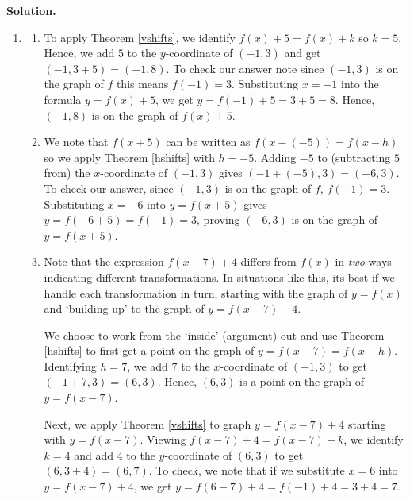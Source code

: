 \begin{ex}
\begin{enumerate}
 \end{enumerate}
 
 \newpage
 
 {\bf Solution.}
 
 \begin{enumerate}
 
 \item 
  
 \begin{enumerate}  
 
 \item To apply Theorem \ref{vshifts}, we identify $f(x)+5 = f(x)+k$  so $k = 5$.  Hence, we add $5$ to the $y$-coordinate of $(-1,3)$  and get  $(-1,3+5) = (-1,8)$.  To check our answer note since $(-1,3)$ is on the graph of $f$ this means $f(-1) = 3$.  Substituting  $x=-1$ into the formula $y = f(x)+5$, we get $y = f(-1)+5 = 3+5 = 8$.  Hence, $(-1,8)$ is on the graph of $f(x)+5$.
 
 \item We note that $f(x+5)$ can be written as $f(x-(-5)) = f(x-h)$ so we apply Theorem \ref{hshifts} with $h=-5$.  Adding $-5$ to (subtracting $5$ from) the $x$-coordinate of  $(-1,3)$ gives $(-1+(-5), 3) = (-6,3)$.  To check our answer,  since $(-1,3)$ is on the graph of $f$, $f(-1) = 3$.  Substituting $x=-6$ into $y=f(x+5)$ gives $y=f(-6+5)=f(-1)=3$, proving $(-6,3)$ is on the graph of $y=f(x+5)$.
 
 \item Note that the expression $f(x-7)+4$ differs from $f(x)$ in \textit{two} ways indicating  different transformations. In situations like this, its best if we handle each transformation in turn, starting with the graph of  $y=f(x)$ and `building up' to the graph of $y = f(x-7)+4$.  
 
 \smallskip
 
 We choose to work from the `inside' (argument) out and use Theorem \ref{hshifts} to first get a point on the graph of $y=f(x-7) = f(x-h)$. Identifying $h=7$, we add $7$ to the $x$-coordinate of $(-1,3)$ to get $(-1+7,3) = (6,3)$.  Hence, $(6,3)$ is a point on the graph of $y = f(x-7)$.  
 
 \smallskip
 
 Next, we apply Theorem \ref{vshifts} to graph $y = f(x-7)+4$ starting with $y=f(x-7)$.  Viewing $f(x-7)+4 = f(x-7)+k$, we identify $k=4$ and add  $4$ to the $y$-coordinate of $(6,3)$ to get $(6,3+4) = (6,7)$.  To check, we note that if we substitute $x=6$ into $y = f(x-7)+4$, we get $y=f(6-7)+4 = f(-1)+4 = 3+4 =7$.
 

\end{enumerate}
\end{enumerate}
\end{ex}
